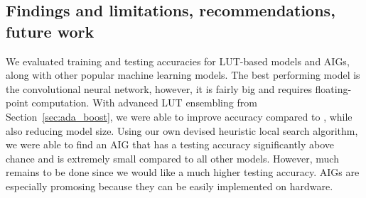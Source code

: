 \subsection{Findings and limitations, recommendations, future work}
We evaluated training and testing accuracies for LUT-based models and AIGs, along with other popular machine learning models. The best performing model is the convolutional neural network, however, it is fairly big and requires floating-point computation. With advanced LUT ensembling from Section~\ref{sec:ada_boost}, we were able to improve accuracy compared to \cite{bib:chatterjee2018learning}, while also reducing model size. Using our own devised heuristic local search algorithm, we were able to find an AIG that has a testing accuracy significantly above chance and is extremely small compared to all other models. However, much remains to be done since we would like a much higher testing accuracy. AIGs are especially promosing because they can be easily implemented on hardware.

